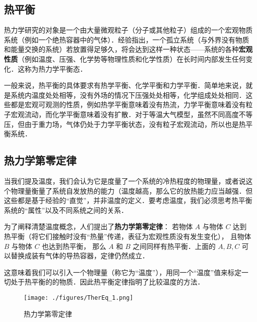 
\begin{issues}
\issueDraft
\end{issues}

\subsection{热平衡}
热力学研究的对象是一个由大量微观粒子（分子或其他粒子）组成的一个宏观物质系统（例如一个绝热容器中的气体）．经验指出，一个孤立系统（与外界没有物质和能量交换的系统）若放置得足够久，将会达到这样一种状态——系统的各种\textbf{宏观性质}（例如温度、压强、化学势等物理性质和化学性质）在长时间内部发生任何变化．这称为热力学平衡态．

一般来说，热平衡的具体要求有热学平衡、化学平衡和力学平衡．简单地来说，就是系统内温度处处相等，没有外场的情况下压强处处相等，化学组成处处相同．这些都是宏观可观测的性质，例如热学平衡意味着没有热流，力学平衡意味着没有粒子宏观流动，而化学平衡意味着没有扩散．对于等温大气模型，虽然不同高度不等压，但由于重力场，气体仍处于力学平衡状态，没有粒子宏观流动，所以也是热平衡系统．

\subsection{热力学第零定律}
当我们提及温度，我们会认为它是度量了一个系统的冷热程度的物理量，或者说这个物理量衡量了系统自发放热的能力（温度越高，那么它的放热能力应当越强．但这些都是基于经验的“直觉”，并非温度的定义．要考虑温度，我们必须思考热平衡系统的“属性”以及不同系统之间的关系．

为了阐释清楚温度概念，人们提出了\textbf{热力学第零定律}：
若物体 $A$ 与物体 $C$ 达到热平衡（将它们接触时没有“热量”传递，表征为宏观性质没有发生变化）， 且物体 $B$ 与物体 $C$ 也达到热平衡， 那么 $A$ 和 $B$ 之间同样有热平衡．上面的 $A,B,C$ 可以替换成装有气体的导热容器，定律仍然成立．

这意味着我们可以引入一个物理量（称它为“温度”），用同一个“温度”值来标定一切处于热平衡的的物质．因此热平衡定律指明了比较温度的方法．
\begin{figure}[ht]
\centering
\texttt{[image: ./figures/TherEq\_1.png]}
\caption{热力学第零定律} \label{TherEq_fig1}
\end{figure}

